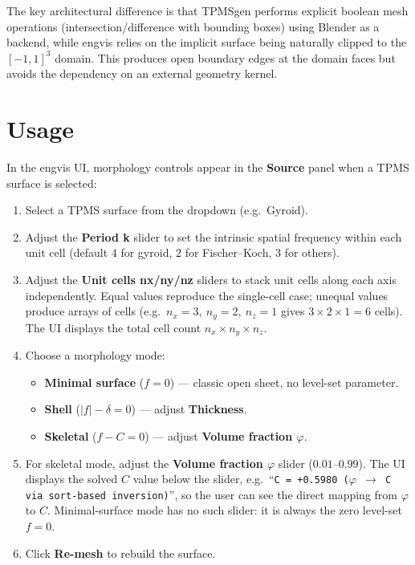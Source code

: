 \documentclass[11pt]{article}
\begin{document}
The key architectural difference is that TPMSgen performs explicit
boolean mesh operations (intersection/difference with bounding boxes)
using Blender as a backend, while engvis relies on the implicit
surface being naturally clipped to the $[-1,1]^3$ domain.  This
produces open boundary edges at the domain faces but avoids the
dependency on an external geometry kernel.

\section{Usage}

In the engvis UI, morphology controls appear in the \textbf{Source}
panel when a TPMS surface is selected:

\begin{enumerate}[leftmargin=2em]
  \item Select a TPMS surface from the dropdown (e.g.\ Gyroid).
  \item Adjust the \textbf{Period k} slider to set the intrinsic
    spatial frequency within each unit cell (default $4$ for gyroid,
    $2$ for Fischer--Koch, $3$ for others).
  \item Adjust the \textbf{Unit cells nx/ny/nz} sliders to stack
    unit cells along each axis independently.  Equal values reproduce
    the single-cell case; unequal values produce arrays of cells
    (e.g.\ $n_x=3,\ n_y=2,\ n_z=1$ gives $3\times2\times1=6$ cells).
    The UI displays the total cell count $n_x\times n_y\times n_z$.
  \item Choose a morphology mode:
    \begin{itemize}
      \item \textbf{Minimal surface} ($f=0$) --- classic open sheet,
            no level-set parameter.
      \item \textbf{Shell} ($|f|-\delta=0$) --- adjust \textbf{Thickness}.
      \item \textbf{Skeletal} ($f-C=0$) --- adjust \textbf{Volume fraction $\varphi$}.
    \end{itemize}
  \item For skeletal mode, adjust the
        \textbf{Volume fraction $\varphi$} slider ($0.01$--$0.99$).
        The UI displays the solved $C$ value below the slider, e.g.\
        ``\texttt{C = +0.5980  ($\varphi$ $\to$ C via sort-based inversion)}'',
        so the user can see the direct mapping from $\varphi$ to $C$.
        Minimal-surface mode has no such slider: it is always the
        zero level-set $f=0$.
  \item Click \textbf{Re-mesh} to rebuild the surface.
\end{enumerate}
\end{document}
